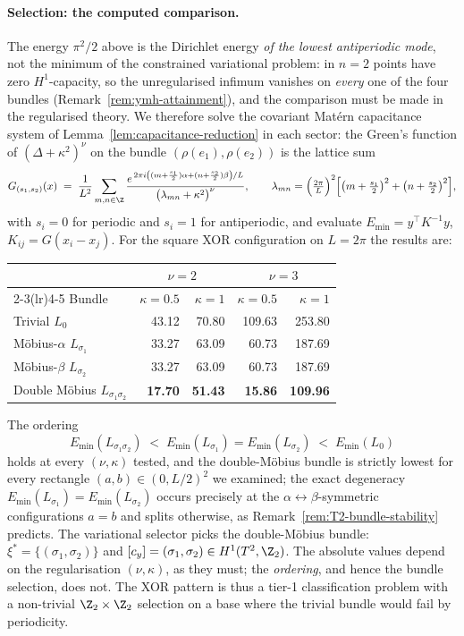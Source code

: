 \paragraph{Selection: the computed comparison.} The energy
$\pi^2/2$ above is the Dirichlet energy \emph{of the lowest
antiperiodic mode}, not the minimum of the constrained variational
problem: in $n=2$ points have zero $H^1$-capacity, so the
unregularised infimum vanishes on \emph{every} one of the four
bundles (Remark~\ref{rem:ymh-attainment}), and the comparison must
be made in the regularised theory. We therefore solve the covariant
Matérn capacitance system of
Lemma~\ref{lem:capacitance-reduction} in each sector: the Green's
function of $(\Delta+\kappa^2)^\nu$ on the bundle
$(\rho(e_1),\rho(e_2))$ is the lattice sum
\[
   G_{(s_1,s_2)}(x)\;=\;\frac{1}{L^2}\sum_{m,n\in\Z}
   \frac{e^{\,2\pi i\left((m+\frac{s_1}{2})\alpha
   +(n+\frac{s_2}{2})\beta\right)/L}}
   {\bigl(\lambda_{mn}+\kappa^2\bigr)^{\nu}},
   \qquad
   \lambda_{mn}=\Bigl(\tfrac{2\pi}{L}\Bigr)^{2}
   \Bigl[\bigl(m+\tfrac{s_1}{2}\bigr)^2+\bigl(n+\tfrac{s_2}{2}\bigr)^2\Bigr],
\]
with $s_i=0$ for periodic and $s_i=1$ for antiperiodic, and evaluate
$E_{\min}=y^\top K^{-1}y$, $K_{ij}=G(x_i-x_j)$. For the square XOR
configuration on $L=2\pi$ the results are:

\begin{center}
\begin{tabular}{lrrrr}
\toprule
& \multicolumn{2}{c}{$\nu=2$} & \multicolumn{2}{c}{$\nu=3$}\\
\cmidrule(lr){2-3}\cmidrule(lr){4-5}
Bundle & $\kappa=0.5$ & $\kappa=1$ & $\kappa=0.5$ & $\kappa=1$\\
\midrule
Trivial $L_0$              & 43.12 & 70.80 & 109.63 & 253.80\\
M\"obius-$\alpha$ $L_{\sigma_1}$ & 33.27 & 63.09 & 60.73 & 187.69\\
M\"obius-$\beta$ $L_{\sigma_2}$  & 33.27 & 63.09 & 60.73 & 187.69\\
Double M\"obius $L_{\sigma_1\sigma_2}$ & \textbf{17.70} & \textbf{51.43}
& \textbf{15.86} & \textbf{109.96}\\
\bottomrule
\end{tabular}
\end{center}

The ordering
\[
   E_{\min}(L_{\sigma_1\sigma_2})
   \;<\; E_{\min}(L_{\sigma_1})=E_{\min}(L_{\sigma_2})
   \;<\; E_{\min}(L_0)
\]
holds at every $(\nu,\kappa)$ tested, and the double-M\"obius bundle
is strictly lowest for every rectangle
$(a,b)\in(0,L/2)^2$ we examined; the exact degeneracy
$E_{\min}(L_{\sigma_1})=E_{\min}(L_{\sigma_2})$ occurs precisely at
the $\alpha\leftrightarrow\beta$-symmetric configurations $a=b$ and
splits otherwise, as Remark~\ref{rem:T2-bundle-stability} predicts.
The variational selector picks the double-M\"obius bundle:
$\xi^*=\{(\sigma_1,\sigma_2)\}$ and $[c_y]=(\sigma_1,\sigma_2)\in
H^1(T^2,\Z_2)$. The absolute values depend on the regularisation
$(\nu,\kappa)$, as they must; the \emph{ordering}, and hence the
bundle selection, does not. The XOR pattern is thus a tier-1
classification problem with a non-trivial $\Z_2\times\Z_2$
selection on a base where the trivial bundle would fail by
periodicity.

